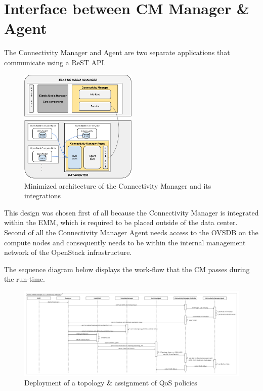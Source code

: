 \section{Interface between CM Manager \& Agent}

The Connectivity Manager and Agent are two separate applications that communicate using a ReST API. 

\begin{figure}[H]
\centering

\includegraphics[width=0.5\textwidth]{images/design/modular_architecture_cm_cma}

\caption{Minimized architecture of the Connectivity Manager and its integrations}
\end{figure}

This design was chosen first of all because the Connectivity Manager is integrated within the EMM, which is required to be placed outside of the data center. Second of all the Connectivity Manager Agent needs access to the OVSDB on the compute nodes and consequently needs to be within the internal management network of the OpenStack infrastructure.

The sequence diagram below displays the work-flow that the CM passes during the run-time.

\begin{figure}[H]
\centering

\includegraphics[width=\textwidth]{images/design/sequence_diagram}

\caption{Deployment of a topology \& assignment of QoS policies}
\end{figure}

